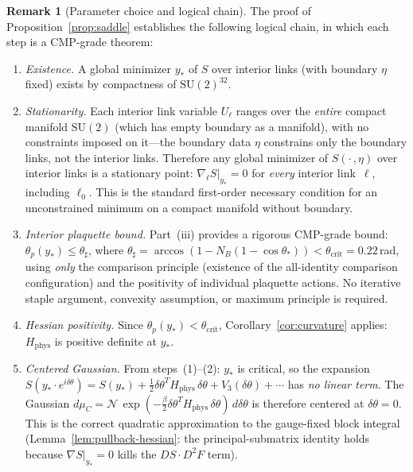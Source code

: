 \documentclass[11pt]{article}
\theoremstyle{definition}
\newtheorem{remark}[theorem]{Remark}
\newcommand{\SU}{\mathrm{SU}}
\begin{document}
\begin{remark}[Parameter choice and logical chain]%
\label{rem:parameters}
The proof of Proposition~\ref{prop:saddle} establishes the
following logical chain, in which each step is a CMP-grade
theorem:

\begin{enumerate}
\item \emph{Existence.}  A global minimizer $y_*$ of $S$ over
interior links (with boundary $\eta$ fixed) exists by
compactness of $\SU(2)^{32}$.

\item \emph{Stationarity.}  Each interior link variable
$U_\ell$ ranges over the \emph{entire} compact manifold
$\SU(2)$ (which has empty boundary as a manifold),
with no constraints imposed on it---the boundary data $\eta$
constrains only the boundary links, not the interior links.
Therefore any global minimizer of $S(\cdot\,,\eta)$ over
interior links is a stationary
point: $\nabla_\ell S|_{y_*}=0$ for \emph{every} interior
link~$\ell$, including $\ell_0$.  This is the standard
first-order necessary condition for an unconstrained minimum
on a compact manifold without boundary.

\item \emph{Interior plaquette bound.}  Part~(iii) provides a
rigorous CMP-grade bound: $\theta_p(y_*)\le\theta_\sharp$,
where $\theta_\sharp=\arccos(1-N_B(1-\cos\theta_*))
<\theta_{\mathrm{crit}}=0.22$\,rad, using \emph{only} the
comparison principle (existence of the all-identity
comparison configuration) and the positivity of individual
plaquette actions.  No iterative staple argument, convexity
assumption, or maximum principle is required.

\item \emph{Hessian positivity.}
Since $\theta_p(y_*)<\theta_{\mathrm{crit}}$,
Corollary~\ref{cor:curvature} applies: $H_{\mathrm{phys}}$
is positive definite at $y_*$.

\item \emph{Centered Gaussian.}
From steps~(1)--(2): $y_*$ is critical, so the expansion
$S(y_*\cdot e^{i\delta\theta})
=S(y_*)+\frac{1}{2}\delta\theta^T H_{\mathrm{phys}}\,\delta\theta
+V_3(\delta\theta)+\cdots$
has \emph{no linear term}.  The Gaussian
$d\mu_C=\mathcal{N}\,\exp(-\frac{\beta}{2}\delta\theta^T
H_{\mathrm{phys}}\,\delta\theta)\,d\delta\theta$
is therefore centered at $\delta\theta=0$.  This is the
correct quadratic approximation to the gauge-fixed block
integral (Lemma~\ref{lem:pullback-hessian}: the
principal-submatrix identity holds because $\nabla S|_{y_*}=0$
kills the $DS\cdot D^2 F$ term).


\end{enumerate}
\end{remark}
\end{document}
